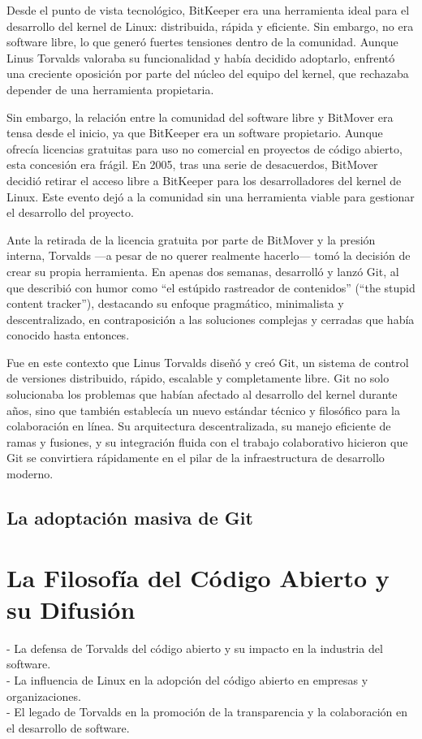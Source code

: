 \documentclass[a4paper,12pt]{article}
\begin{document}
Desde el punto de vista tecnológico, BitKeeper era una herramienta ideal para el
desarrollo del kernel de Linux: distribuida, rápida y eficiente. Sin embargo, no
era software libre, lo que generó fuertes tensiones dentro de la comunidad.
Aunque Linus Torvalds valoraba su funcionalidad y había decidido adoptarlo,
enfrentó una creciente oposición por parte del núcleo del equipo del kernel, que
rechazaba depender de una herramienta propietaria.

Sin embargo, la relación entre la comunidad del software libre y BitMover era
tensa desde el inicio, ya que BitKeeper era un software propietario. Aunque
ofrecía licencias gratuitas para uso no comercial en proyectos de código
abierto, esta concesión era frágil. En 2005, tras una serie de desacuerdos,
BitMover decidió retirar el acceso libre a BitKeeper para los desarrolladores
del kernel de Linux. Este evento dejó a la comunidad sin una herramienta viable
para gestionar el desarrollo del proyecto.

Ante la retirada de la licencia gratuita por parte de BitMover y la presión
interna, Torvalds —a pesar de no querer realmente hacerlo— tomó la decisión de
crear su propia herramienta. En apenas dos semanas, desarrolló y lanzó Git, al
que describió con humor como “el estúpido rastreador de contenidos” (“the stupid
content tracker”), destacando su enfoque pragmático, minimalista y
descentralizado, en contraposición a las soluciones complejas y cerradas que
había conocido hasta entonces.

Fue en este contexto que Linus Torvalds diseñó y creó Git, un sistema de control
de versiones distribuido, rápido, escalable y completamente libre. Git no solo
solucionaba los problemas que habían afectado al desarrollo del kernel durante
años, sino que también establecía un nuevo estándar técnico y filosófico para la
colaboración en línea. Su arquitectura descentralizada, su manejo eficiente de
ramas y fusiones, y su integración fluida con el trabajo colaborativo hicieron
que Git se convirtiera rápidamente en el pilar de la infraestructura de
desarrollo moderno.


\subsection{La adoptación masiva de Git}



\section{La Filosofía del Código Abierto y su Difusión} 
- La defensa de Torvalds
del código abierto y su impacto en la industria del software.\\ 
- La influencia
de Linux en la adopción del código abierto en empresas y organizaciones.\\ 
- El
legado de Torvalds en la promoción de la transparencia y la colaboración en el
desarrollo de software.
\end{document}
